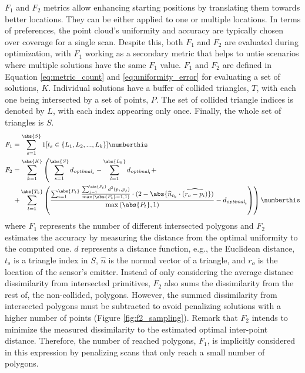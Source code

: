 $F_1$ and $F_2$ metrics allow enhancing starting positions by translating them towards better locations. They can be either applied to one or multiple locations. In terms of preferences, the point cloud's uniformity and accuracy are typically chosen over coverage for a single scan. Despite this, both $F_1$ and $F_2$ are evaluated during optimization, with $F_1$ working as a secondary metric that helps to untie scenarios where multiple solutions have the same $F_1$ value. $F_1$ and $F_2$ are defined in Equation \ref{eq:metric_count} and \ref{eq:uniformity_error} for evaluating a set of solutions, $K$. Individual solutions have a buffer of collided triangles, $T$, with each one being intersected by a set of points, $P$. The set of collided triangle indices is denoted by $L$, with each index appearing only once. Finally, the whole set of triangles is $S$.
\begin{align*}
    \textit{F}_{1} &= \sum_{s=1}^{\abs{S}} 1[t_s \in \{L_1, L_2, ..., L_k\}]
    \numberthis \label{eq:metric_count}\\
    \textit{F}_{2} &= \sum_{k=1}^{\abs{K}} \left(\sum_{s=1}^{\abs{S}} d_{\textit{optimal}_{s}} - \sum_{l=1}^{\abs{L_k}} d_{\textit{optimal}_{l}}  +\right.\\ & 
    \left. + \sum_{t=1}^{\abs{T_k}} \left(\frac{\sum_{i=1}^{\abs{P_t}} \frac{\sum_{j=1}^{\abs{P_t}} d^{2}(p_i, p_j)}{\max\left(\abs{P_t} - 1, 1\right)} \cdot (2 - \abs{\widehat{n}_{t_{k}} \cdot \widehat{\left(r_{o} - p_{i}\right)}})}{\max\left(\abs{P_t}, 1\right)} - d_{\textit{optimal}_{t}}\right)\right)
    \numberthis \label{eq:uniformity_error}
\end{align*}
where $F_1$ represents the number of different intersected polygons and $F_2$ estimates the accuracy by measuring the distance from the optimal uniformity to the computed one. $d$ represents a distance function, e.g., the Euclidean distance, $t_s$ is a triangle index in $S$, $\hat{n}$ is the normal vector of a triangle, and $r_o$ is the location of the sensor's emitter. Instead of only considering the average distance dissimilarity from intersected primitives, $F_2$ also sums the dissimilarity from the rest of, the non-collided, polygons. However, the summed dissimilarity from intersected polygons must be subtracted to avoid penalizing solutions with a higher number of points (Figure \ref{fig:f2_sampling}). Remark that $F_2$ intends to minimize the measured dissimilarity to the estimated optimal inter-point distance. Therefore, the number of reached polygons, $F_1$, is implicitly considered in this expression by penalizing scans that only reach a small number of polygons.

